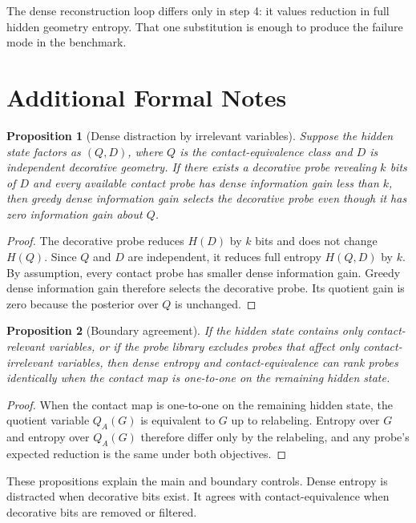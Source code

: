 \documentclass{article}
\newtheorem{proposition}{Proposition}
\begin{document}
The dense reconstruction loop differs only in step 4: it values reduction in full hidden geometry entropy. That one substitution is enough to produce the failure mode in the benchmark.

\section{Additional Formal Notes}

\begin{proposition}[Dense distraction by irrelevant variables]
Suppose the hidden state factors as $(Q,D)$, where $Q$ is the contact-equivalence class and $D$ is independent decorative geometry. If there exists a decorative probe revealing $k$ bits of $D$ and every available contact probe has dense information gain less than $k$, then greedy dense information gain selects the decorative probe even though it has zero information gain about $Q$.
\end{proposition}

\begin{proof}
The decorative probe reduces $H(D)$ by $k$ bits and does not change $H(Q)$. Since $Q$ and $D$ are independent, it reduces full entropy $H(Q,D)$ by $k$. By assumption, every contact probe has smaller dense information gain. Greedy dense information gain therefore selects the decorative probe. Its quotient gain is zero because the posterior over $Q$ is unchanged.
\end{proof}

\begin{proposition}[Boundary agreement]
If the hidden state contains only contact-relevant variables, or if the probe library excludes probes that affect only contact-irrelevant variables, then dense entropy and contact-equivalence can rank probes identically when the contact map is one-to-one on the remaining hidden state.
\end{proposition}

\begin{proof}
When the contact map is one-to-one on the remaining hidden state, the quotient variable $Q_A(G)$ is equivalent to $G$ up to relabeling. Entropy over $G$ and entropy over $Q_A(G)$ therefore differ only by the relabeling, and any probe's expected reduction is the same under both objectives.
\end{proof}

These propositions explain the main and boundary controls. Dense entropy is distracted when decorative bits exist. It agrees with contact-equivalence when decorative bits are removed or filtered.
\end{document}
